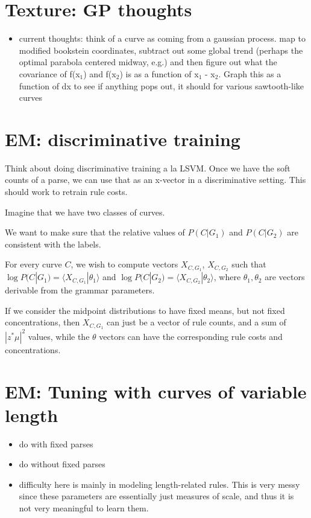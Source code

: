 \documentclass{book}
\begin{document}
\section{Texture: GP thoughts}
\label{sec-5_21}


\begin{itemize}
\item current thoughts: think of a curve as coming from a gaussian
    process. map to modified bookstein coordinates, subtract out some
    global trend (perhaps the optimal parabola centered midway, e.g.)
    and then figure out what the covariance of f(x$_1$) and f(x$_2$) is as
    a function of x$_1$ - x$_2$. Graph this as a function of dx to see if
    anything pops out, it should for various sawtooth-like curves
\end{itemize}
\section{EM: discriminative training}
\label{sec-5_22}

Think about doing discriminative training a la LSVM. Once we have the
soft counts of a parse, we can use that as an x-vector in a
discriminative setting. This should work to retrain rule costs.

Imagine that we have two classes of curves.

We want to make sure that the relative values of $P(C|G_1)$ and
$P(C|G_2)$ are consistent with the labels.

For every curve $C$, we wish to compute vectors $X_{C, G_1}$, $X_{C,
G_2}$ such that $\log P(C|G_1) = \langle X_{C, G_1} | \theta_1 \rangle$ and
$\log P(C|G_2) = \langle X_{C, G_2} | \theta_2 \rangle$, where $\theta_1,
\theta_2$ are vectors derivable from the grammar parameters.

If we consider the midpoint distributions to have fixed means, but not
fixed concentrations, then $X_{C, G_1}$ can just be a vector of rule
counts, and a sum of $|z^* \mu|^2$ values, while the $\theta$ vectors
can have the corresponding rule costs and concentrations.
\section{EM: Tuning with curves of variable length}
\label{sec-5_23}

\begin{itemize}
\item do with fixed parses
\item do without fixed parses
\item difficulty here is mainly in modeling length-related rules. This
    is very messy since these parameters are essentially just measures
    of scale, and thus it is not very meaningful to learn them.
\end{itemize}
\end{document}
